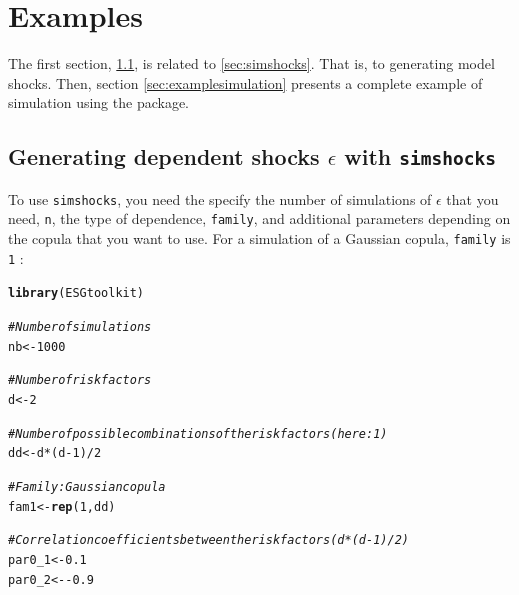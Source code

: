 \documentclass[a4paper]{article}\usepackage[]{graphicx}\usepackage[]{color}
\makeatletter
\newcommand{\hlnum}[1]{\textcolor[rgb]{0.686,0.059,0.569}{#1}}%
\newcommand{\hlcom}[1]{\textcolor[rgb]{0.678,0.584,0.686}{\textit{#1}}}%
\newcommand{\hlopt}[1]{\textcolor[rgb]{0,0,0}{#1}}%
\newcommand{\hlstd}[1]{\textcolor[rgb]{0.345,0.345,0.345}{#1}}%
\newcommand{\hlkwb}[1]{\textcolor[rgb]{0.69,0.353,0.396}{#1}}%
\newcommand{\hlkwd}[1]{\textcolor[rgb]{0.737,0.353,0.396}{\textbf{#1}}}%
\newenvironment{kframe}{%
 \def\at@end@of@kframe{}%
 \ifinner\ifhmode%
  \def\at@end@of@kframe{\end{minipage}}%
  \begin{minipage}{\columnwidth}%
 \fi\fi%
 \def\FrameCommand##1{\hskip\@totalleftmargin \hskip-\fboxsep
 \colorbox{shadecolor}{##1}\hskip-\fboxsep
     \hskip-\linewidth \hskip-\@totalleftmargin \hskip\columnwidth}%
 \MakeFramed {\advance\hsize-\width
   \@totalleftmargin\z@ \linewidth\hsize
   \@setminipage}}%
 {\par\unskip\endMakeFramed%
 \at@end@of@kframe}
\newenvironment{knitrout}{}{} %
\newcommand{\code}[1]{\mbox{\texttt{#1}}}
\makeatother
\begin{document}
\medskip

\section{Examples}
\label{sec:examples}

The first section, \ref{sec:exampleshocks}, is related to \ref{sec:simshocks}. That is, to generating model shocks. Then, section \ref{sec:examplesimulation} presents a complete example of simulation using the package. 

\subsection{Generating dependent shocks $\epsilon$ with \code{simshocks}}
\label{sec:exampleshocks}

To use \code{simshocks}, you need the specify the number of simulations of $\epsilon$ that you need, \code{n}, the type of dependence, \code{family}, and additional parameters depending on the copula that you want to use. For a simulation of a Gaussian copula, \code{family} is \code{1} : 

\begin{knitrout}
\color{fgcolor}\begin{kframe}
\begin{alltt}
\hlkwd{library}\hlstd{(ESGtoolkit)}
\end{alltt}
\end{kframe}
\end{knitrout}

\begin{knitrout}
\color{fgcolor}\begin{kframe}
\begin{alltt}
\hlcom{# Number of simulations}
\hlstd{nb} \hlkwb{<-} \hlnum{1000}

\hlcom{# Number of risk factors}
\hlstd{d} \hlkwb{<-} \hlnum{2}

\hlcom{# Number of possible combinations of the risk factors (here : 1)}
\hlstd{dd} \hlkwb{<-} \hlstd{d}\hlopt{*}\hlstd{(d}\hlopt{-}\hlnum{1}\hlstd{)}\hlopt{/}\hlnum{2}

\hlcom{# Family : Gaussian copula }
\hlstd{fam1} \hlkwb{<-} \hlkwd{rep}\hlstd{(}\hlnum{1}\hlstd{, dd)}

\hlcom{# Correlation coefficients between the risk factors (d*(d-1)/2)}
\hlstd{par0_1} \hlkwb{<-} \hlnum{0.1}
\hlstd{par0_2} \hlkwb{<-} \hlopt{-}\hlnum{0.9}
\end{alltt}
\end{kframe}
\end{knitrout}
\end{document}
